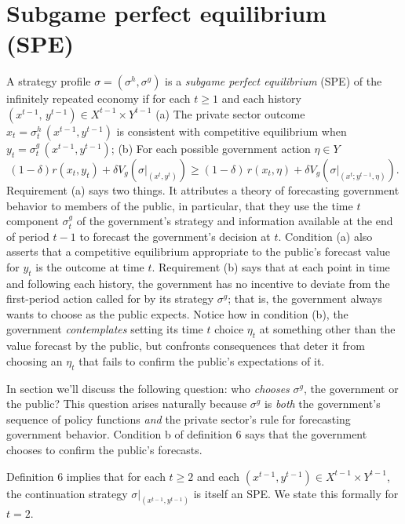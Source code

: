 \section{Subgame perfect equilibrium (SPE)}
\medskip{}  A strategy profile $\sigma = (\sigma^h,\sigma^g)$
is a {\it subgame perfect equilibrium} (SPE)
 of the infinitely repeated economy if for each
$t\geq 1$ and each history $(x^{t-1},\, y^{t-1}) \in X^{t-1}\times Y^{t-1}$
\medskip
\noindent(a)  The private sector outcome
 $x_t = \sigma^h_t\, (x^{t-1},y^{t-1})$ is consistent
with   competitive equilibrium when $y_t = \sigma^g_t\,(x^{t-1}, y^{t-1})$;
\medskip
\noindent(b)  For each possible government action $\eta \in  Y$
$$ (1-\delta)  r(x_t, y_t) + \delta V_g (\sigma\vert_{(x^t,
y^t)})
\geq  (1-\delta)\, r(x_t,\eta) +\delta V_g (\sigma\vert_{(x^t;
y^{t-1},\eta)}) .$$
Requirement (a)
says two things.  It attributes a theory of forecasting government
behavior to members of the public, in particular, that they
use the time $t$ component $\sigma_t^g$ of the government's strategy
and information available at the end of period $t-1$ to
forecast the government's decision at $t$.  Condition (a)
also asserts that a competitive
equilibrium appropriate to the public's  forecast value for $y_t$ is
the outcome at time $t$.  Requirement (b) says that
at each point in time and  following each history, the
government has no incentive to deviate from the first-period action called
for by its strategy $\sigma^g$; that is, the government always
 wants
to choose as the public expects.   Notice
how in condition (b), the government
{\it contemplates\/} setting its time $t$ choice $\eta_t$ at something
other than the value forecast by the public, but confronts consequences
 that deter it from  choosing an $\eta_t$ that
fails to confirm the public's expectations of it.

In section   we'll discuss the following question: who {\it chooses\/} $\sigma^g$,
the government or the public?  This question arises naturally because
$\sigma^g$ is {\it both\/} the government's sequence of policy
functions {\it and\/} the private sector's rule
for forecasting government behavior. Condition b of  definition 6
says that the government chooses to confirm the public's
forecasts.


  Definition 6  implies that for each $t \geq 2$ and each $(x^{t-1},
y^{t-1})
\in X^{t-1} \times Y^{t-1}$, the continuation strategy
$\sigma\vert_{(x^{t-1},y^{t-1})}$ is itself an SPE.
We state this formally for $t=2$.

